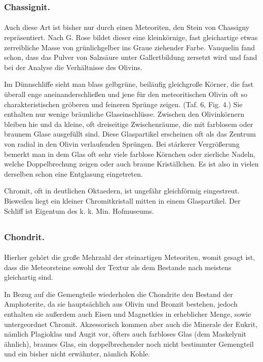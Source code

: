 \documentclass[a4paper, 11pt, oneside, polutonikogreek, german]{article}
\begin{document}
\subsubsection{Chassignit.}
\paragraph{}
Auch diese Art ist bisher nur durch einen Meteoriten, den Stein von Chassigny repräsentiert. Nach G. Rose bildet dieser eine kleinkörnige, fast gleichartige etwas zerreibliche Masse von grünlichgelber ins Graue ziehender Farbe. Vauquelin fand schon, dass das Pulver von Salzsäure unter Gallertbildung zersetzt wird und fand bei der Analyse die Verhältnisse des Olivins.

Im Dünnschliffe sieht man blass gelbgrüne, beiläufig gleichgroße Körner, die fast überall enge aneinanderschließen und jene für den meteoritischen Olivin oft so charakteristischen gröberen und feineren Sprünge zeigen. (Taf. 6, Fig. 4.) Sie enthalten nur wenige bräunliche Glaseinschlüsse. Zwischen den Olivinkörnern bleiben hie und da kleine, oft dreiseitige Zwischenräume, die mit farblosem oder braunem Glase ausgefüllt sind. Diese Glaspartikel erscheinen oft als das Zentrum von radial in den Olivin verlaufenden Sprüngen. Bei stärkerer Vergrößerung bemerkt man in dem Glas oft sehr viele farblose Körnchen oder zierliche Nadeln, welche Doppelbrechung zeigen oder auch braune Kriställchen. Es ist also in vielen derselben schon eine Entglasung eingetreten.

Chromit, oft in deutlichen Oktaedern, ist ungefähr gleichförmig eingestreut. Bisweilen liegt ein kleiner Chromitkristall mitten in einem Glaspartikel. Der Schliff ist Eigentum des k. k. Min. Hofmuseums.
\clearpage
\subsection{}
\subsubsection{Chondrit.}
\paragraph{}
Hierher gehört die große Mehrzahl der steinartigen Meteoriten, womit gesagt ist, dass die Meteorsteine sowohl der Textur als dem Bestande nach meistens gleichartig sind.

In Bezug auf die Gemengteile wiederholen die Chondrite den Bestand der Amphoterite, da sie hauptsächlich aus Olivin und Bronzit bestehen, jedoch enthalten sie außerdem auch Eisen und Magnetkies in erheblicher Menge, sowie untergeordnet Chromit. Akzessorisch kommen aber auch die Minerale der Eukrit, nämlich Plagioklas und Augit vor, öfters auch farbloses Glas (dem Maskelynit ähnlich), braunes Glas, ein doppelbrechender noch nicht bestimmter Gemengteil und ein bisher nicht erwähnter, nämlich Kohle.
\end{document}
